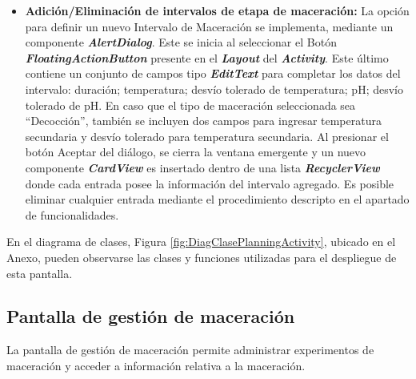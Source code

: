 \begin{itemize}
                    \item \textbf{Adición/Eliminación de intervalos de etapa de maceración:} La opción para definir un nuevo Intervalo de Maceración se implementa, mediante un componente \textbf{\textit{\gls{AlertDialog}}}. Este se inicia al seleccionar el Botón \textbf{\textit{\gls{FloatingActionButton}}} presente en el \textbf{\textit{\gls{Layout}}} del \textbf{\textit{\gls{Activity}}}. Este último contiene un conjunto de campos tipo \textbf{\textit{\gls{EditText}}} para completar los datos del intervalo: duración; temperatura; desvío tolerado de temperatura; pH; desvío tolerado de pH. En caso que el tipo de maceración seleccionada sea ``Decocción'', también se incluyen dos campos para ingresar temperatura secundaria y desvío tolerado para temperatura secundaria. Al presionar el botón Aceptar del diálogo, se cierra la ventana emergente y un nuevo componente \textbf{\textit{\gls{CardView}}} es insertado dentro de una lista \textbf{\textit{\gls{RecyclerView}}} donde cada entrada posee la información del intervalo agregado. Es posible eliminar cualquier entrada mediante el procedimiento descripto en el apartado de funcionalidades.
                \end{itemize}
                
                \par En el diagrama de clases, Figura \ref{fig:DiagClasePlanningActivity}, ubicado en el Anexo, pueden observarse las clases y funciones utilizadas para el despliegue de esta pantalla.
        
        \subsection{Pantalla de gestión de maceración}
        \label{DescripPantallaGestiónMaceración}
            \par La pantalla de gestión de maceración permite administrar experimentos de maceración y acceder a información relativa a la maceración.
            
